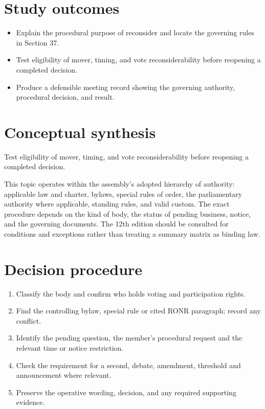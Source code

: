 \documentclass[11pt]{article}
\begin{document}
\SuiteOpen
{}
\section{Study outcomes}
\begin{itemize}[leftmargin=*,itemsep=4pt]
\item Explain the procedural purpose of reconsider and locate the governing rules in Section 37.
\item Test eligibility of mover, timing, and vote reconsiderability before reopening a completed decision.
\item Produce a defensible meeting record showing the governing authority, procedural decision, and result.
\end{itemize}

\section{Conceptual synthesis}
Test eligibility of mover, timing, and vote reconsiderability before reopening a completed decision.

This topic operates within the assembly’s adopted hierarchy of authority: applicable law and charter, bylaws, special rules of order, the parliamentary authority where applicable, standing rules, and valid custom. The exact procedure depends on the kind of body, the status of pending business, notice, and the governing documents. The 12th edition should be consulted for conditions and exceptions rather than treating a summary matrix as binding law.
\section{Decision procedure}
\begin{enumerate}[leftmargin=*,itemsep=4pt]
\item Classify the body and confirm who holds voting and participation rights.
\item Find the controlling bylaw, special rule or cited RONR paragraph; record any conflict.
\item Identify the pending question, the member’s procedural request and the relevant time or notice restriction.
\item Check the requirement for a second, debate, amendment, threshold and announcement where relevant.
\item Preserve the operative wording, decision, and any required supporting evidence.
\end{enumerate}
\end{document}
